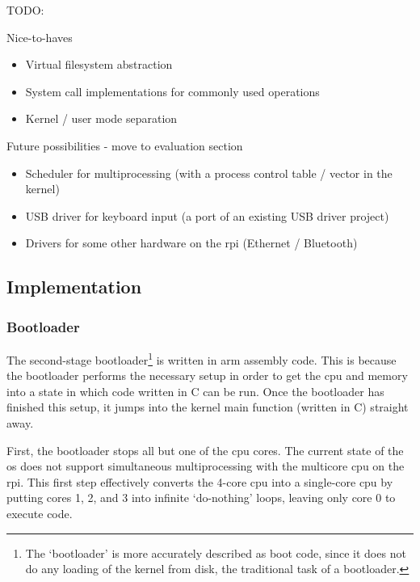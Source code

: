 \documentclass{article}
\begin{document}
TODO:

Nice-to-haves
\begin{itemize}
    \item Virtual filesystem abstraction
    \item System call implementations for commonly used operations
    \item Kernel / user mode separation
\end{itemize}

Future possibilities - move to evaluation section
\begin{itemize}
    \item Scheduler for multiprocessing (with a process control table / vector
        in the kernel)
    \item USB driver for keyboard input (a port of an existing USB driver
        project)
    \item Drivers for some other hardware on the \gls{rpi} (Ethernet /
        Bluetooth)
\end{itemize}


\subsection{Implementation}

\subsubsection{Bootloader}
The second-stage bootloader\footnote{The `bootloader' is more accurately
described as boot code, since it does not do any loading of the kernel from
disk, the traditional task of a bootloader.} is written in \gls{arm} assembly
code. This is because the bootloader performs the necessary setup in order to
get the \gls{cpu} and memory into a state in which code written in C can be
run. Once the bootloader has finished this setup, it jumps into the kernel main
function (written in C) straight away.

First, the bootloader stops all but one of the \gls{cpu} cores. The current
state of the \gls{os} does not support simultaneous multiprocessing with the
multicore \gls{cpu} on the \gls{rpi}. This first step effectively converts the
4-core \gls{cpu} into a single-core \gls{cpu} by putting cores 1, 2, and 3 into
infinite `do-nothing' loops, leaving only core 0 to execute code.
\end{document}
